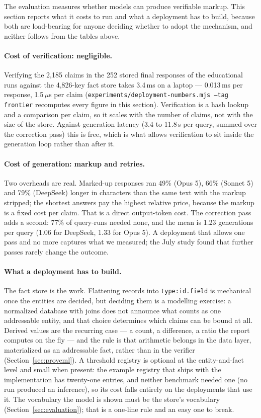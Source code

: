 \documentclass[11pt,a4paper]{article}
\begin{document}
The evaluation measures whether models can produce verifiable markup. This section reports what it costs to run and what a deployment has to build, because both are load-bearing for anyone deciding whether to adopt the mechanism, and neither follows from the tables above.

\paragraph{Cost of verification: negligible.} Verifying the 2{,}185 claims in the 252 stored final responses of the educational runs against the 4{,}826-key fact store takes 3.4\,ms on a laptop --- 0.013\,ms per response, 1.5\,$\mu$s per claim (\texttt{experiments/deployment-numbers.mjs --tag frontier} recomputes every figure in this section). Verification is a hash lookup and a comparison per claim, so it scales with the number of claims, not with the size of the store. Against generation latency (3.4 to 11.8\,s per query, summed over the correction pass) this is free, which is what allows verification to sit inside the generation loop rather than after it.

\paragraph{Cost of generation: markup and retries.} Two overheads are real. Marked-up responses ran 49\% (Opus 5), 66\% (Sonnet 5) and 79\% (DeepSeek) longer in characters than the same text with the markup stripped; the shortest answers pay the highest relative price, because the markup is a fixed cost per claim. That is a direct output-token cost. The correction pass adds a second: 77\% of query-runs needed none, and the mean is 1.23 generations per query (1.06 for DeepSeek, 1.33 for Opus 5). A deployment that allows one pass and no more captures what we measured; the July study found that further passes rarely change the outcome.

\paragraph{What a deployment has to build.} The fact store is the work. Flattening records into \texttt{type:id.field} is mechanical once the entities are decided, but deciding them is a modelling exercise: a normalized database with joins does not announce what counts as one addressable entity, and that choice determines which claims can be bound at all. Derived values are the recurring case --- a count, a difference, a ratio the report computes on the fly --- and the rule is that arithmetic belongs in the data layer, materialized as an addressable fact, rather than in the verifier (Section~\ref{sec:proveml}). A threshold registry is optional at the entity-and-fact level and small when present: the example registry that ships with the implementation has twenty-one entries, and neither benchmark needed one (no run produced an inference), so its cost falls entirely on the deployments that use it. The vocabulary the model is shown must be the store's vocabulary (Section~\ref{sec:evaluation}); that is a one-line rule and an easy one to break.
\end{document}
